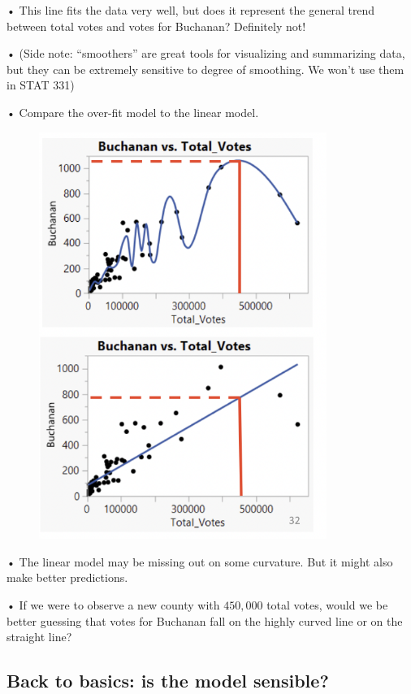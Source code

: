 \documentclass[
  letterpaper,
  DIV=11,
  numbers=noendperiod]{scrreprt}
\begin{document}
• This line fits the data very well, but does it represent the general
trend between total votes and votes for Buchanan? Definitely not!

• (Side note: ``smoothers'' are great tools for visualizing and
summarizing data, but they can be extremely sensitive to degree of
smoothing. We won't use them in STAT 331)

• Compare the over-fit model to the linear model.

\begin{figure}

{\centering \includegraphics[width=3.6875in,height=\textheight]{images/mod4_pt2_15.png}

}

\end{figure}

• The linear model may be missing out on some curvature. But it might
also make better predictions.

• If we were to observe a new county with \(450,000\) total votes, would
we be better guessing that votes for Buchanan fall on the highly curved
line or on the straight line?

\hypertarget{back-to-basics-is-the-model-sensible}{%
\subsection{Back to basics: is the model
sensible?}\label{back-to-basics-is-the-model-sensible}}
\end{document}
